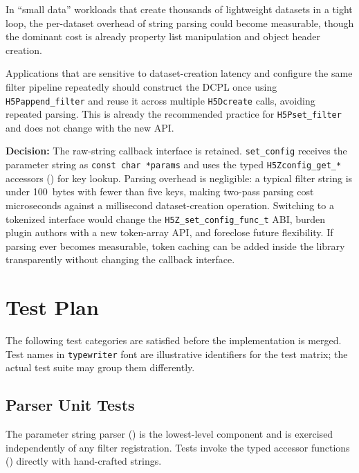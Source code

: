 \documentclass[../RFC-HDFG-2026-001.tex]{subfiles}
\begin{document}
In ``small data'' workloads that create thousands of lightweight datasets in a
tight loop, the per-dataset overhead of string parsing could become measurable,
though the dominant cost is already property list manipulation and object header
creation.

Applications that are sensitive to dataset-creation latency and configure the
same filter pipeline repeatedly should construct the DCPL once using
\texttt{H5Pappend\_filter} and reuse it across multiple \texttt{H5Dcreate}
calls, avoiding repeated parsing. This is already the recommended practice for
\texttt{H5Pset\_filter} and does not change with the new API.

\noindent\textbf{Decision:} The raw-string callback interface is retained.
\texttt{set\_config} receives the parameter string as \texttt{const char
*params} and uses the typed \texttt{H5Zconfig\_get\_*} accessors
() for key lookup.  Parsing
overhead is negligible: a typical filter string is under 100~bytes with
fewer than five keys, making two-pass parsing cost microseconds against a
millisecond dataset-creation operation.  Switching to a tokenized interface
would change the \texttt{H5Z\_set\_config\_func\_t} ABI, burden plugin
authors with a new token-array API, and foreclose future flexibility.
If parsing ever becomes measurable, token caching can be added inside the
library transparently without changing the callback interface.


\section{Test Plan}
\label{sec:test-plan}

The following test categories are satisfied before the implementation is
merged.  Test names in \texttt{typewriter} font are illustrative identifiers
for the test matrix; the actual test suite may group them differently.

\subsection{Parser Unit Tests}
\label{sec:test-parser}

\noindent The parameter string parser () is the
lowest-level component and is exercised independently of any filter
registration.  Tests invoke the typed accessor functions
() directly with hand-crafted strings.
\end{document}

